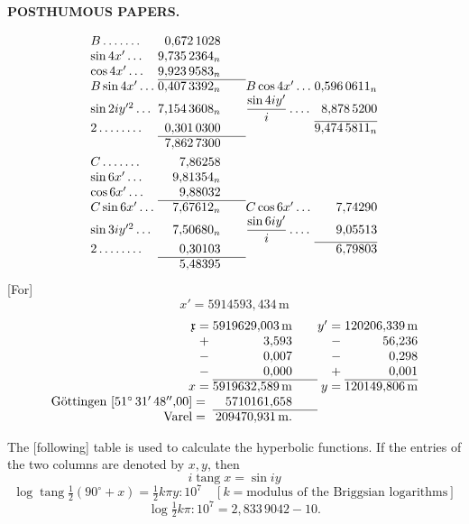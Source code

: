 \par\clearpage
{}\hfill{\small\textbf{POSTHUMOUS PAPERS.}}\hfill\null\par\medskip
\[
\begin{array}{@{}l@{\;}r@{\qquad}l@{\;}r@{}}
B\,.\,.\,.\,.\,.\,.\,.&0{,}672\,1028&&\\
\sin4x'\,.\,.\,.&9{,}735\,2364_n&&\\
\cos4x'\,.\,.\,.&9{,}923\,9583_n&&\\\cline{2-2}
B\sin4x'\,.\,.\,.&0{,}407\,3392_n&B\cos4x'\,.\,.\,.&0{,}596\,0611_n\\
\sin2iy^{\prime 2}\,.\,.\,.&7{,}154\,3608_n&\dfrac{\sin4iy'}{i}\,.\,.\,.\,.&8{,}878\,5200\\\cline{4-4}
2\,.\,.\,.\,.\,.\,.\,.\,.&0{,}301\,0300&&9{,}474\,5811_n\\\cline{2-2}
&7{,}862\,7300&&\\[3pt]
C\,.\,.\,.\,.\,.\,.\,.&7{,}86258&&\\
\sin6x'\,.\,.\,.&9{,}81354_n&&\\
\cos6x'\,.\,.\,.&9{,}88032&&\\\cline{2-2}
C\sin6x'\,.\,.\,.&7{,}67612_n&C\cos6x'\,.\,.\,.&7{,}74290\\
\sin3iy^{\prime 2}\,.\,.\,.&7{,}50680_n&\dfrac{\sin6iy'}{i}\,.\,.\,.\,.&9{,}05513\\\cline{4-4}
2\,.\,.\,.\,.\,.\,.\,.\,.&0{,}30103&&6{,}79803\\\cline{2-2}
&5{,}48395&&
\end{array}
\]
[For]
\[x'=5914593{,}434\,\mathrm{m}\]
\[
\begin{array}{@{}r@{\;}r@{\qquad}r@{\;}r@{}}
\mathfrak{x}=&5919629{,}003\,\mathrm{m}&y'=&120206{,}339\,\mathrm{m}\\
+&3{,}593&-&56{,}236\\
-&0{,}007&-&0{,}298\\
-&0{,}000&+&0{,}001\\\cline{2-2}\cline{4-4}
x=&5919632{,}589\,\mathrm{m}&y=&120149{,}806\,\mathrm{m}\\
\text{Göttingen }[51^\circ\,31'\,48''{,}00]={}&5710161{,}658&&\\\cline{2-2}
\text{Varel}={}&209470{,}931\,\mathrm{m}.&&
\end{array}
\]
\bigskip
{\centering [30.]\par}
The [following] table is used to calculate the hyperbolic functions. If the entries of the two columns are denoted by \(x,y\), then
\[i\operatorname{tang}x=\sin iy\]
\[
\log\operatorname{tang}\tfrac12(90^\circ+x)=\tfrac12k\pi y:10^7
\quad[k=\text{modulus of the Briggsian logarithms}]
\]
\[\log\tfrac12k\pi:10^7=2{,}833\,9042-10.\]

